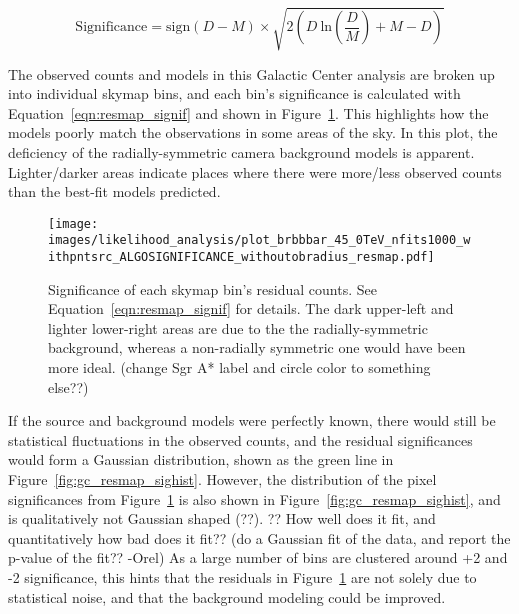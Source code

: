   \begin{equation}\label{eqn:resmap_signif}
    \textrm{Significance} = \textrm{sign}(D-M) \times \sqrt{ 2 \left ( D \: \textrm{ln} \left ( \frac{D}{M} \right ) + M - D \right ) }
  \end{equation}

  The observed counts and models in this Galactic Center analysis are broken up into individual skymap bins, and each bin's significance is calculated with Equation~\ref{eqn:resmap_signif} and shown in Figure~\ref{fig:gc_resmap}.
  This highlights how the models poorly match the observations in some areas of the sky.
  In this plot, the deficiency of the radially-symmetric camera background models is apparent.
  Lighter/darker areas indicate places where there were more/less observed counts than the best-fit models predicted.
  
  \begin{figure}[ht]
    \centering
    \texttt{[image: images/likelihood\_analysis/plot\_brbbbar\_45\_0TeV\_nfits1000\_withpntsrc\_ALGOSIGNIFICANCE\_withoutobradius\_resmap.pdf]}
    \caption[Galactic Center Residual Map]
    {
      Significance of each skymap bin's residual counts.
      See Equation~\ref{eqn:resmap_signif} for details.
      The dark upper-left and lighter lower-right areas are due to the the radially-symmetric background, whereas a non-radially symmetric one would have been more ideal.
      {\color{red}(change Sgr A* label and circle color to something else??)}
    }
    \label{fig:gc_resmap}
  \end{figure}
  
  If the source and background models were perfectly known, there would still be statistical fluctuations in the observed counts, and the residual significances would form a Gaussian distribution, shown as the green line in Figure~\ref{fig:gc_resmap_sighist}.
  However, the distribution of the pixel significances from Figure~\ref{fig:gc_resmap} is also shown in Figure~\ref{fig:gc_resmap_sighist}, and is qualitatively not Gaussian shaped {\color{red}(??)}.
  {\color{red}?? How well does it fit, and quantitatively how bad does it fit??}
  {\color{red}(do a Gaussian fit of the data, and report the p-value of the fit?? -Orel)}
  As a large number of bins are clustered around +2 and -2 significance, this hints that the residuals in Figure~\ref{fig:gc_resmap} are not solely due to statistical noise, and that the background modeling could be improved.
  
